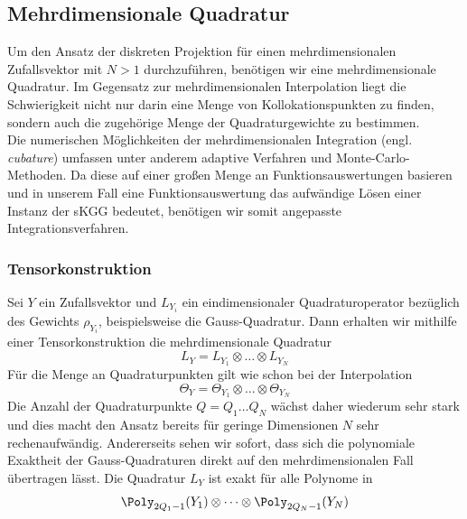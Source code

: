 \subsection{Mehrdimensionale Quadratur}
\label{chapter:multivariatequad}
Um den Ansatz der diskreten Projektion für einen mehrdimensionalen Zufallsvektor mit $N>1$ durchzuführen, benötigen wir eine mehrdimensionale Quadratur. Im Gegensatz zur mehrdimensionalen Interpolation liegt die Schwierigkeit nicht nur darin eine Menge von Kollokationspunkten zu finden, sondern auch die zugehörige Menge der Quadraturgewichte zu bestimmen.\\
Die numerischen Möglichkeiten der mehrdimensionalen Integration (engl. \emph{cubature}) umfassen unter anderem adaptive Verfahren und Monte-Carlo-Methoden. Da diese auf einer großen Menge an Funktionsauswertungen basieren und in unserem Fall eine Funktionsauswertung das aufwändige Lösen einer Instanz der sKGG bedeutet, benötigen wir somit angepasste Integrationsverfahren.
\subsubsection*{Tensorkonstruktion}
Sei $Y$ ein Zufallsvektor und $L_{Y_i}$ ein eindimensionaler Quadraturoperator bezüglich des Gewichts $\rho_{Y_i}$, beispielsweise die Gauss-Quadratur. Dann erhalten wir mithilfe einer Tensorkonstruktion die mehrdimensionale Quadratur
\[L_Y=L_{Y_1}\otimes\dots\otimes L_{Y_N}\]
Für die Menge an Quadraturpunkten gilt wie schon bei der Interpolation
\[\Theta_Y=\Theta_{Y_1}\otimes\dots\otimes \Theta_{Y_N}\]
Die Anzahl der Quadraturpunkte $Q=Q_1\dots Q_N$ wächst daher wiederum sehr stark und dies macht den Ansatz bereits für geringe Dimensionen $N$ sehr rechenaufwändig. Andererseits sehen wir sofort, dass sich die polynomiale Exaktheit der Gauss-Quadraturen direkt auf den mehrdimensionalen Fall übertragen lässt. Die Quadratur $L_Y$ ist exakt für alle Polynome in
\[\Poly_{2Q_1-1}(Y_1)\otimes\dots\otimes\Poly_{2Q_N-1}(Y_N)\]
